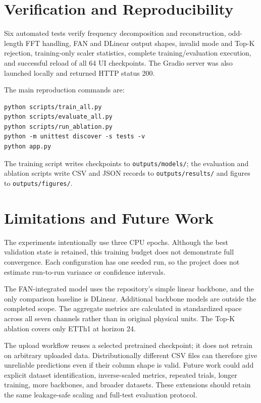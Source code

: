 \documentclass[conference,10pt]{IEEEtran}
\begin{document}
\section{Verification and Reproducibility}
Six automated tests verify frequency decomposition and reconstruction, odd-length FFT handling, FAN and DLinear output shapes, invalid mode and Top-K rejection, training-only scaler statistics, complete training/evaluation execution, and successful reload of all 64 UI checkpoints. The Gradio server was also launched locally and returned HTTP status 200.

The main reproduction commands are:
\begin{verbatim}
python scripts/train_all.py
python scripts/evaluate_all.py
python scripts/run_ablation.py
python -m unittest discover -s tests -v
python app.py
\end{verbatim}
The training script writes checkpoints to \texttt{outputs/models/}; the evaluation and ablation scripts write CSV and JSON records to \texttt{outputs/results/} and figures to \texttt{outputs/figures/}.

\section{Limitations and Future Work}
The experiments intentionally use three CPU epochs. Although the best validation state is retained, this training budget does not demonstrate full convergence. Each configuration has one seeded run, so the project does not estimate run-to-run variance or confidence intervals.

The FAN-integrated model uses the repository's simple linear backbone, and the only comparison baseline is DLinear. Additional backbone models are outside the completed scope. The aggregate metrics are calculated in standardized space across all seven channels rather than in original physical units. The Top-K ablation covers only ETTh1 at horizon 24.

The upload workflow reuses a selected pretrained checkpoint; it does not retrain on arbitrary uploaded data. Distributionally different CSV files can therefore give unreliable predictions even if their column shape is valid. Future work could add explicit dataset identification, inverse-scaled metrics, repeated trials, longer training, more backbones, and broader datasets. These extensions should retain the same leakage-safe scaling and full-test evaluation protocol.
\end{document}
